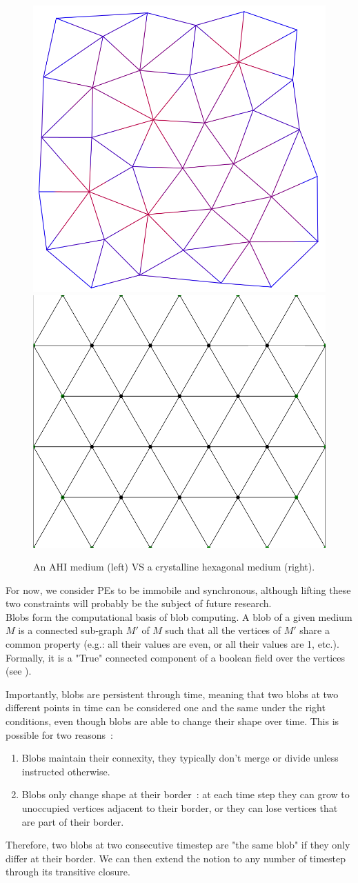 \documentclass{article}
\begin{document}
\begin{figure}[h]
	\centering\includegraphics[width=0.4\linewidth]{assets/amorphous_medium.png}
	\hspace{0.1\linewidth}
	\centering\includegraphics[width=0.4\linewidth]{assets/hexagonal_medium.png}
	\caption{An AHI medium (left) VS a crystalline hexagonal medium (right).}
	\label{fig:amorphous_vs_crystaline}
\end{figure}

For now, we consider PEs to be immobile and synchronous, although lifting these two constraints will probably be the subject of future research.\\

Blobs form the computational basis of blob computing. A blob of a given medium $M$ is a connected sub-graph $M'$ of $M$ such that all the vertices of $M'$ share a common property (e.g.: all their values are even, or all their values are 1, etc.). Formally, it is a "True" connected component of a boolean field over the vertices (see \cite{Voronoi}).

Importantly, blobs are persistent through time, meaning that two blobs at two different points in time can be considered one and the same under the right conditions, even though blobs are able to change their shape over time. This is possible for two reasons~:
\begin{enumerate}
	\item Blobs maintain their connexity, they typically don't merge or divide unless instructed otherwise.
	\item Blobs only change shape at their border~: at each time step they can grow to unoccupied vertices adjacent to their border, or they can lose vertices that are part of their border.
\end{enumerate}
Therefore, two blobs at two consecutive timestep are "the same blob" if they only differ at their border. We can then extend the notion to any number of timestep through its transitive closure.
\end{document}
